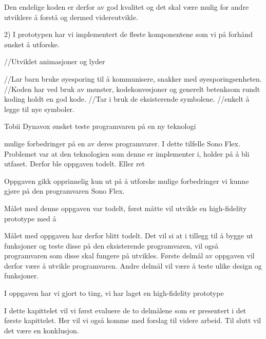 Den endelige koden er derfor av god kvalitet og det skal være mulig for andre utviklere å forstå og dermed videreutvikle. 


2) I prototypen har vi implementert de fleste komponentene som vi på forhånd ønsket å utforske. 


//Utviklet animasjoner og lyder


//Lar barn bruke øyesporing til å kommunisere, snakker med øyesporingsenheten.
//Koden har ved bruk av mønster, kodekonvesjoner og generelt betenksom rundt koding holdt en god kode.
//Tar i bruk de eksisterende symbolene.
//enkelt å legge til nye symboler.




Tobii Dynavox ønsket teste programvaren på en ny teknologi 

mulige forbedringer på en av deres programvarer. I dette tilfelle Sono Flex. Problemet var at den teknologien som denne er implementer i, holder på å bli utfaset. Derfor ble oppgaven todelt. Eller ret


Oppgaven gikk opprinnelig kun ut på å utforske mulige forbedringer vi kunne gjøre på den programvaren Sono Flex. 


Målet med denne oppgaven var todelt, først måtte vil utvikle en high-fidelity prototype med å


Målet med oppgaven har derfor blitt todelt. Det vil si at i tillegg til å bygge ut funksjoner og teste disse på den eksisterende programvaren, vil også programvaren som disse skal fungere på utvikles. Første delmål av oppgaven vil derfor være å utvikle programvaren. Andre delmål vil være å teste ulike design og funksjoner.


I oppgaven har vi gjort to ting, vi har laget en high-fidelity prototype 































I dette kapittelet vil vi først evaluere de to delmålene som er presentert i det første kapittelet. Her vil vi også komme med forslag til videre arbeid. Til slutt vil det være en konklusjon.

